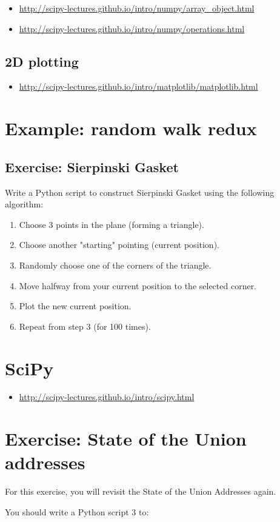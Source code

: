 \begin{itemize}
\item \url{http://scipy-lectures.github.io/intro/numpy/array_object.html}
\item \url{http://scipy-lectures.github.io/intro/numpy/operations.html}
\end{itemize}

\subsection{2D plotting}

\begin{itemize}
\item \url{http://scipy-lectures.github.io/intro/matplotlib/matplotlib.html}
\end{itemize}

\section{Example: random walk redux}



\subsection{Exercise: Sierpinski Gasket}
Write a Python script to construct Sierpinski Gasket using the following
algorithm:

\begin{enumerate}
\item Choose 3 points in the plane (forming a triangle).
\item Choose another "starting" pointing (current position).
\item Randomly choose one of the corners of the triangle.
\item Move halfway from your current position to the selected corner.
\item Plot the new current position.
\item Repeat from step 3 (for 100 times).
\end{enumerate}

\section{SciPy}

\begin{itemize}
\item \url{http://scipy-lectures.github.io/intro/scipy.html}
\end{itemize}

\section{Exercise: State of the Union addresses}

For this exercise, you will revisit the State of the Union Addresses again.

You should write a Python script 3 to:


